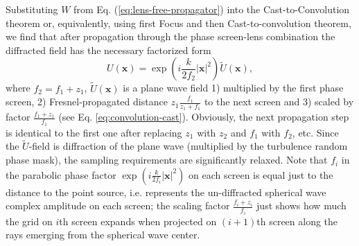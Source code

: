 Substituting $W$ from Eq. (\ref{eq:lens-free-propagator}) into the
Cast-to-Convolution theorem or, equivalently, using first Focus and then
Cast-to-convolution theorem, we find that after propagation through the phase
screen-lens combination the diffracted field has the necessary factorized form
\begin{equation} \label{eq:factorized-field}
  U(\bm{x}) = \exp (i\frac{k}{2 f_{2}} |\bm{x}|^{2}) \tilde{U} (\bm{x}),
\end{equation}
where $f_{2} = f_{1}+z_{1}$, $\tilde{U} (\bm{x})$ is a plane wave field 1)
multiplied by the first phase screen, 2) Fresnel-propagated distance $z_{1}
\frac{f_{1}}{z_{1}+f_{1}}$ to the next screen and 3) scaled by
factor $\frac{f_{1}+z_{1}}{f_{{1}}}$ (see Eq.
\ref{eq:convolution-cast}). Obviously, the next propagation step is
identical to the first one after replacing $z_{1}$ with $z_{2}$ and $f_{1}$
with $f_{2}$, etc. Since the $\tilde{U}$-field is diffraction
of the plane wave (multiplied by the turbulence random phase mask), the
sampling requirements are significantly relaxed. Note that $f_{i}$ in the
parabolic phase
factor $\exp (i\frac{k}{2f_{i}} |\bm{x}|^{2})$ on each screen is equal just to
the distance
to the point source, i.e. represents the un-diffracted spherical wave complex
amplitude on each
screen; the scaling factor $\frac{f_{i}+z_{i}}{f_{i}}$ just shows how much the
grid on $i$th screen expands when projected on $(i+1)$th screen along the rays
emerging from the spherical wave center.

